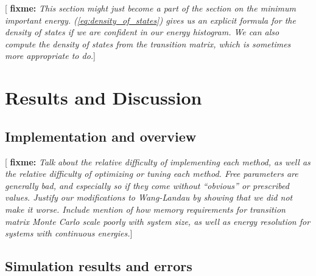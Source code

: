 \documentclass[11pt]{article}
\newcommand{\red}[1]{{\bf \color{red} #1}}
\newcommand{\fixme}[1]{[\red{fixme:} \emph{#1}]}
\begin{document}
\fixme{This section might just become a part of the section on the
  minimum important energy. (\ref{eq:density_of_states}) gives us an
  explicit formula for the density of states if we are confident in
  our energy histogram. We can also compute the density of states from
  the transition matrix, which is sometimes more appropriate to do.}





\section{Results and Discussion}
\label{sec:results}

\subsection{Implementation and overview}
\label{sec:implementation}

\fixme{Talk about the relative difficulty of implementing each method,
  as well as the relative difficulty of optimizing or tuning each
  method. Free parameters are generally bad, and especially so if they
  come without ``obvious'' or prescribed values. Justify our
  modifications to Wang-Landau by showing that we did not make it
  worse. Include mention of how memory requirements for transition
  matrix Monte Carlo scale poorly with system size, as well as energy
  resolution for systems with continuous energies.}

\subsection{Simulation results and errors}
\label{sec:results_and_errors}
\end{document}
